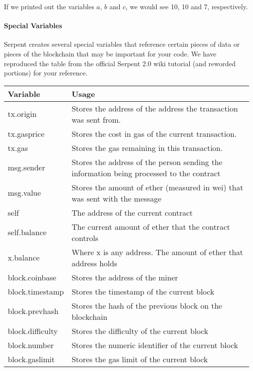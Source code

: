 \documentclass[12pt]{article}
\begin{document}
If we printed out the variables $a$, $b$ and $c$, we would see 10, 10 and 7, respectively. 

\paragraph{Special Variables}

Serpent creates several special variables that reference certain pieces of data or pieces of the blockchain that may be important for your code. We have reproduced the table from the official Serpent 2.0 wiki tutorial (and reworded portions) for your reference. \cite{Serpent}

\begin{center}
	\begin{tabular}{| l | p{9cm} |}
	\hline
	Variable & Usage \\ \hline
	tx.origin & Stores the address of the address the transaction was sent from. \\ \hline
	tx.gasprice & Stores the cost in gas of the current transaction. \\ \hline	
	tx.gas & Stores the gas remaining in this transaction. \\ \hline
	msg.sender & Stores the address of the person sending the information being processed to the contract \\ \hline
	msg.value & Stores the amount of ether (measured in wei) that was sent with the message \\ \hline
	self & The address of the current contract \\ \hline
	self.balance & The current amount of ether that the contract controls \\ \hline
	x.balance & Where x is any address. The amount of ether that address holds \\ \hline
	block.coinbase & Stores the address of the miner \\ \hline
	block.timestamp & Stores the timestamp of the current block \\ \hline
	block.prevhash & Stores the hash of the previous block on the blockchain \\ \hline
	block.difficulty & Stores the difficulty of the current block \\ \hline
	block.number & Stores the numeric identifier of the current block \\ \hline
	block.gaslimit & Stores the gas limit of the current block \\ \hline
	\end{tabular}
\end{center}
\end{document}
